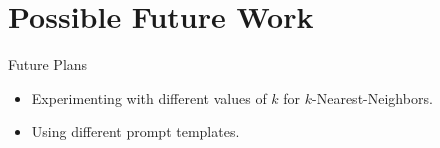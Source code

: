 \section{Possible Future Work}

\begin{frame}{Future Plans}

\begin{itemize}
  \item Experimenting with different values of $k$ for $k$-Nearest-Neighbors.
  \item Using different prompt templates.
\end{itemize}

\end{frame}
